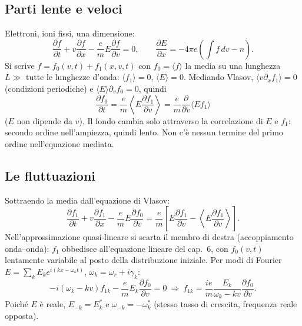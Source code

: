 \subsection{Parti lente e veloci}
Elettroni, ioni fissi, una dimensione:
\begin{equation}
\frac{\partial f}{\partial t}+v\frac{\partial f}{\partial x}-\frac em E\frac{\partial f}{\partial v}=0,\qquad\frac{\partial E}{\partial x}=-4\pi e\left(\int f\,dv-n\right).
\end{equation}
Si scrive $f=f_0(v,t)+f_1(x,v,t)$ con $f_0=\langle f\rangle$ la media su una lunghezza $L\gg$ tutte le lunghezze d'onda: $\langle f_1\rangle=0$, $\langle E\rangle=0$. Mediando Vlasov, $\langle v\partial_xf_1\rangle=0$ (condizioni periodiche) e $\langle E\rangle\partial_vf_0=0$, quindi
\begin{equation}
\frac{\partial f_0}{\partial t}=\frac em\left\langle E\frac{\partial f_1}{\partial v}\right\rangle=\frac em\frac{\partial}{\partial v}\langle Ef_1\rangle
\end{equation}
($E$ non dipende da $v$). Il fondo cambia solo attraverso la correlazione di $E$ e $f_1$: secondo ordine nell'ampiezza, quindi lento. Non c'è nessun termine del primo ordine nell'equazione mediata.

\subsection{Le fluttuazioni}
Sottraendo la media dall'equazione di Vlasov:
\begin{equation}
\frac{\partial f_1}{\partial t}+v\frac{\partial f_1}{\partial x}-\frac emE\frac{\partial f_0}{\partial v}=\frac em\left[E\frac{\partial f_1}{\partial v}-\left\langle E\frac{\partial f_1}{\partial v}\right\rangle\right].
\end{equation}
Nell'approssimazione quasi-lineare si scarta il membro di destra (accoppiamento onda--onda): $f_1$ obbedisce all'equazione lineare del cap.~6, con $f_0(v,t)$ lentamente variabile al posto della distribuzione iniziale. Per modi di Fourier $E=\sum_kE_ke^{i(kx-\omega_kt)}$, $\omega_k=\omega_r+i\gamma_k$:
\begin{equation}
-i(\omega_k-kv)f_{1k}-\frac emE_k\frac{\partial f_0}{\partial v}=0\ \Rightarrow\ f_{1k}=\frac{ie}{m}\frac{E_k}{\omega_k-kv}\frac{\partial f_0}{\partial v}.
\end{equation}
Poiché $E$ è reale, $E_{-k}=E_k^*$ e $\omega_{-k}=-\omega_k^*$ (stesso tasso di crescita, frequenza reale opposta).

